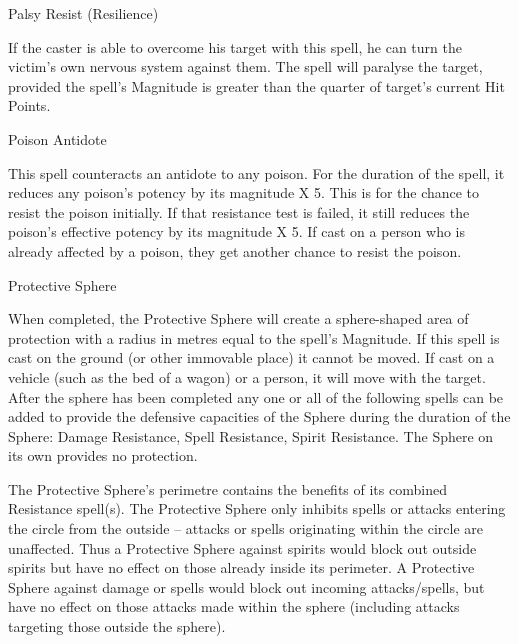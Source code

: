 \begin{rpg-spell}
{Palsy}
{Resist (Resilience)}

If the caster is able to overcome his target with this spell, he can turn the victim’s own nervous system against them. The spell will paralyse the target, provided the spell’s Magnitude is greater than the quarter of target’s current Hit Points. 
\end{rpg-spell}


\begin{rpg-spell}
{Poison Antidote}
{}

This spell counteracts an antidote to any poison. For the duration of the spell, it reduces any poison’s potency by its magnitude X 5. This is for the chance to resist the poison initially. If that resistance test is failed, it still reduces the poison’s effective potency by its magnitude X 5.   If cast on a person who is already affected by a poison, they get another chance to resist the poison.
\end{rpg-spell}


\begin{rpg-spell}
{Protective Sphere}
{}

When completed, the Protective Sphere will create a sphere-shaped area of protection with a radius in metres equal to the spell’s Magnitude. If this spell is cast on the ground (or other immovable place) it cannot be moved. If cast on a vehicle (such as the bed of a wagon) or a person, it will move with the target. After the sphere has been completed any one or all of the following spells can be added to provide the defensive capacities of the Sphere during the duration of the Sphere: Damage Resistance, Spell Resistance, Spirit Resistance. The Sphere on its own provides no protection.

The Protective Sphere’s perimetre contains the benefits of its combined Resistance spell(s). The Protective Sphere only inhibits spells or attacks entering the circle from the outside – attacks or spells originating within the circle are unaffected. Thus a Protective Sphere against spirits would block out outside spirits but have no effect on those already inside its perimeter. A Protective Sphere against damage or spells would block out incoming attacks/spells, but have no effect on those attacks made within the sphere (including attacks targeting those outside the sphere). 
\end{rpg-spell}



